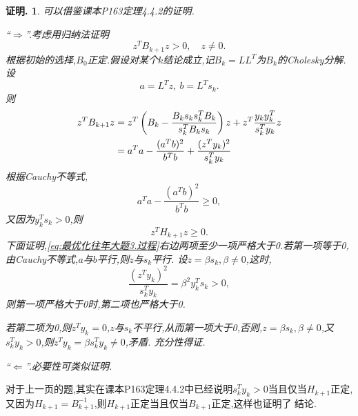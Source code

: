 \documentclass[oneside,a4paper,12pt]{ctexbook}
\theoremstyle{nonumberplain}
\newtheorem{inproof}{证明.}
\theoremstyle{nonumberplain}
\theoremstyle{nonumberplain}
\newenvironment{proof}{
    \begin{tcolorbox}[enhanced,colback=cyan!5!white,colframe=cyan!75!black,drop fuzzy shadow,breakable,arc=0mm]
        \begin{inproof}
}{
        \end{inproof}
    \end{tcolorbox}
}
\begin{document}
    \begin{proof}
        可以借鉴课本P163定理4.4.2的证明.
        
        ``$\Rightarrow$''.考虑用归纳法证明
        \begin{equation}
            \label{eq:最优化往年大题3 result}
            z^TB_{k+1}z>0,\quad z\neq 0.
        \end{equation}
        根据初始的选择,$B_0$正定.假设对某个$k$结论成立,记$B_k=LL^T$为$B_k$的Cholesky分解.设
        \begin{equation}
            \label{eq:最优化往年大题3 简化}
            a=L^Tz,\ b=L^Ts_k.
        \end{equation}
        则
        \begin{align}
            z^TB_{k+1}z&=z^T\left(B_k-\frac{B_ks_ks_k^TB_k}{s_k^TB_ks_k}\right)z+z^T\frac{y_ky_k^T}{s_k^Ty_k}z\notag\\
            &=a^Ta-\frac{(a^Tb)^2}{b^Tb}+\frac{(z^Ty_k)^2}{s_k^Ty_k}\label{eq:最优化往年大题3.过程}
        \end{align}
        根据Cauchy不等式,
        \begin{equation}
            a^Ta-\frac{(a^Tb)^2}{b^Tb}\geqslant 0,
        \end{equation}
        又因为$y_k^Ts_k>0$,则
        \begin{equation*}
            z^TH_{k+1}z\geqslant 0.
        \end{equation*}
        下面证明,\eqref{eq:最优化往年大题3.过程}右边两项至少一项严格大于0.若第一项等于0,由Cauchy不等式,$a$与$b$平行,则$z$与$s_k$平行.
        设$z=\beta s_k,\beta\neq 0$,这时,
        \begin{equation*}
            \frac{(z^Ty_k)^2}{s_k^Ty_k}=\beta^2 y_k^Ts_k>0,
        \end{equation*}
        则第一项严格大于0时,第二项也严格大于0.
        
        若第二项为0,则$z^Ty_k=0$,$z$与$s_k$不平行,从而第一项大于0,否则,$z=\beta s_k,\beta\neq 0$,又$s_k^Ty_k>0$,则$z^Ty_k=\beta s_k^Ty_k\neq 0$,矛盾.
        充分性得证.

        ``$\Leftarrow$''.必要性可类似证明.
    \end{proof}

    \begin{marker}
        对于上一页的题,其实在课本P163定理4.4.2中已经说明$s_k^Ty_k>0$当且仅当$H_{k+1}$正定,又因为$H_{k+1}=B_{k+1}^{-1}$,则$H_{k+1}$正定当且仅当$B_{k+1}$正定,这样也证明了
        结论.
    \end{marker}
\end{document}
